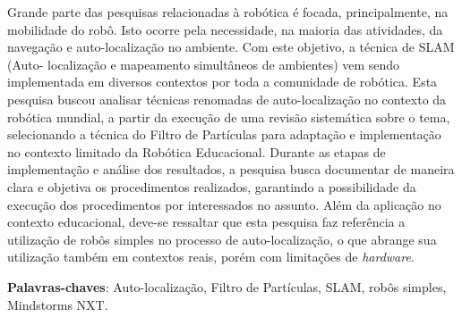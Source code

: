 \begin{resumo}

 	Grande parte das pesquisas relacionadas à robótica é focada, principalmente, na mobilidade do robô. Isto ocorre pela necessidade,
  na maioria das atividades, da navegação e auto-localização no ambiente. Com este objetivo, a técnica de SLAM (Auto-
  localização e mapeamento simultâneos de ambientes) vem sendo implementada em diversos contextos por toda a comunidade de robótica.
  Esta pesquisa buscou analisar técnicas renomadas de auto-localização no contexto da robótica mundial, a partir da execução de uma
  revisão sistemática sobre o tema, selecionando a técnica do Filtro de Partículas para adaptação e implementação no contexto limitado
  da Robótica Educacional. Durante as etapas de implementação e análise dos resultados, a pesquisa busca documentar de maneira
  clara e objetiva os procedimentos realizados, garantindo a possibilidade da execução dos procedimentos por interessados no assunto.
  Além da aplicação no contexto educacional, deve-se ressaltar que esta pesquisa faz referência a utilização de robôs simples
  no processo de auto-localização, o que abrange sua utilização também em contextos reais, porém com limitações de \textit{hardware}.

 \vspace{\onelineskip}

 \noindent
 \textbf{Palavras-chaves}: Auto-localização, Filtro de Partículas, SLAM, robôs simples, Mindstorms NXT.
\end{resumo}
